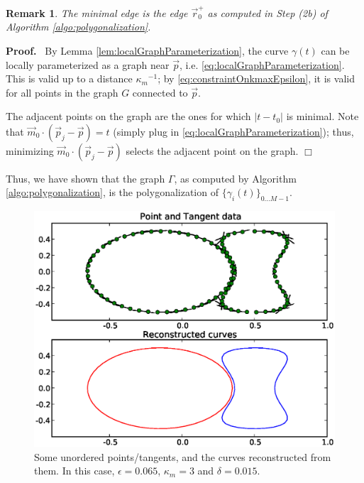 \documentclass{article}
\newtheorem{varremark}[cntr]{Remark}
\newenvironment{remark}{\begin{varremark}\em}{\em\end{varremark}}
\newenvironment{proof}{
  \noindent\textbf{Proof.}\ }{\hspace*{\fill}
  \begin{math}\Box\end{math}\medskip}
\numberwithin{cntr}{section}
\numberwithin{equation}{section}
\newcommand{\abs}[1]{\left| #1 \right|}%
\newcommand{\vp}[0]{{\vec{p}}}
\newcommand{\vr}[0]{{\vec{r}}}
\newcommand{\vm}[0]{{\vec{m}}}
\newcommand{\Oto}[1]{{0 \ldots #1-1}}
\newcommand{\curveSet}{{ \{ \gamma_i(t) \}_{\Oto{M}}}}
\newcommand{\curvemax}{{\kappa_{m}}}
\newcommand{\curvemaxi}{{\curvemax^{-1}}}
\begin{document}
\begin{remark}
  The minimal edge is the edge $\vr^{+}_{0}$ as computed in Step (2b) of Algorithm \ref{algo:polygonalization}.
\end{remark}

\begin{proof}
  By Lemma \ref{lem:localGraphParameterization}, the curve $\gamma(t)$ can be locally parameterized as a graph near $\vp$, i.e. \eqref{eq:localGraphParameterization}. This is valid up to a distance $\curvemaxi$; by \eqref{eq:constraintOnkmaxEpsilon}, it is valid for all points in the graph $G$ connected to $\vp$.

The adjacent points on the graph are the ones for which $\abs{t-t_{0}}$ is minimal. Note that $\vm_{0} \cdot (\vp_{j} - \vp) = t$ (simply plug in \eqref{eq:localGraphParameterization}); thus, minimizing $\vm_{0} \cdot (\vp_{j} - \vp)$ selects the adjacent point on the graph.
\end{proof}

Thus, we have shown that the graph $\Gamma$, as computed by Algorithm \ref{algo:polygonalization}, is the polygonalization of $\curveSet$.

\begin{figure}
\setlength{\unitlength}{0.240900pt}
\ifx\plotpoint\undefined\newsavebox{\plotpoint}\fi
\sbox{\plotpoint}{\rule[-0.200pt]{0.400pt}{0.400pt}}%
\includegraphics[scale=0.5]{example1.eps}

\caption{Some unordered points/tangents, and the curves reconstructed from them. In this case, $\epsilon=0.065$, $\curvemax=3$ and $\delta=0.015$.}
\label{fig:basicExample}
\end{figure}
\end{document}
